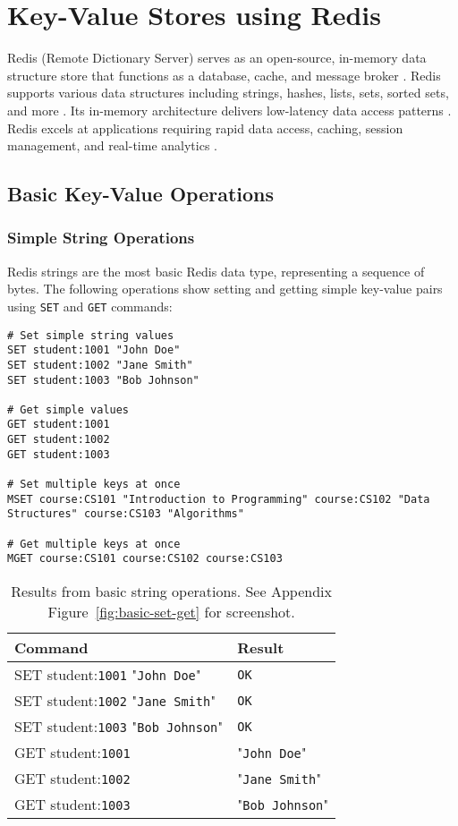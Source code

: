 \chapter{Key-Value Stores using Redis}

Redis (Remote Dictionary Server) serves as an open-source, in-memory data structure store that functions as a database, cache, and message broker \parencite{redis_paper}. Redis supports various data structures including strings, hashes, lists, sets, sorted sets, and more \parencite{redis_documentation}. Its in-memory architecture delivers low-latency data access patterns \parencite{redis_paper}. Redis excels at applications requiring rapid data access, caching, session management, and real-time analytics \parencite{redis_documentation}.

\section{Basic Key-Value Operations}

\subsection{Simple String Operations}

Redis strings are the most basic Redis data type, representing a sequence of bytes. The following operations show setting and getting simple key-value pairs using \texttt{SET} and \texttt{GET} commands:

\begin{verbatim}
# Set simple string values
SET student:1001 "John Doe"
SET student:1002 "Jane Smith"
SET student:1003 "Bob Johnson"

# Get simple values
GET student:1001
GET student:1002
GET student:1003

# Set multiple keys at once
MSET course:CS101 "Introduction to Programming" course:CS102 "Data Structures" course:CS103 "Algorithms"

# Get multiple keys at once
MGET course:CS101 course:CS102 course:CS103
\end{verbatim}

\begin{table}[H]
  \centering
  \begin{tabular}{|l|l|}
    \hline
    \textbf{Command} & \textbf{Result} \\
    \hline
    SET student:\texttt{1001} "\texttt{John Doe}" & \texttt{OK} \\
    SET student:\texttt{1002} "\texttt{Jane Smith}" & \texttt{OK} \\
    SET student:\texttt{1003} "\texttt{Bob Johnson}" & \texttt{OK} \\
    GET student:\texttt{1001} & "\texttt{John Doe}" \\
    GET student:\texttt{1002} & "\texttt{Jane Smith}" \\
    GET student:\texttt{1003} & "\texttt{Bob Johnson}" \\
    \hline
  \end{tabular}
  \caption{Results from basic string operations. See Appendix Figure~\ref{fig:basic-set-get} for screenshot.}
\end{table}

